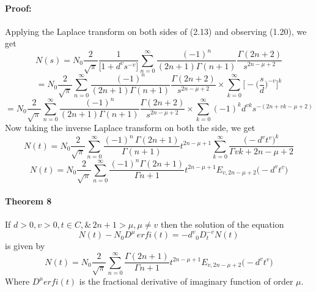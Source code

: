 \documentclass{article}
\begin{document}
\paragraph{Proof:}
Applying the Laplace transform on both sides of (2.13) and observing (1.20), we get
\begin{equation*}
    N(s)=N_0
    {\frac{2}{\sqrt{\pi}}}
    \frac{1}{\big[1+{d^v}{s^{-v}}\big]}
    \sum_{n = 0}^{\infty}
    \frac{(-1)^n}{(2n+1)\Gamma{(n+1)}}
    \frac{\Gamma{(2n+2)}}{s^{2n- \mu +2}}
\end{equation*}
\begin{equation*}
    =N_0
    {\frac{2}{\sqrt{\pi}}}
    \sum_{n = 0}^{\infty}
    \frac{(-1)^n}{(2n+1)\Gamma{(n+1)}}
    \frac{\Gamma{(2n+2)}}{s^{2n- \mu +2}}
    \times
    \sum_{k=0}^{\infty}
    \bigg[
        -{\bigg(\frac{s}{d}\bigg)^{-v}}
    \bigg]^k
\end{equation*}
\begin{equation*}
    =N_0
    {\frac{2}{\sqrt{\pi}}}
    \sum_{n = 0}^{\infty}
    \frac{(-1)^n}{(2n+1)\Gamma{(n+1)}}
    \frac{\Gamma{(2n+2)}}{s^{2n- \mu +2}}
    \times
    \sum_{k=0}^{\infty}
    (-1)^k{d^{vk}}{s^{-(2n+vk- \mu +2)}}
\end{equation*}
Now taking the inverse Laplace transform on both the side, we get
\begin{equation*}
    N(t)=N_0
    {\frac{2}{\sqrt{\pi}}}
    \sum_{n = 0}^{\infty}
    \frac{(-1)^n\,\Gamma{(2n+1)}}{\Gamma{(n+1)}}
    t^{2n-{\mu}+1}
    \sum_{k=0}^{\infty}
    \frac{\big(-{d^v}{t^v})^k}{\Gamma{vk+2n-\mu+2}}
\end{equation*}
\begin{equation*}
    N(t)=N_0
    {\frac{2}{\sqrt{\pi}}}
    \sum_{n = 0}^{\infty}
    \frac{(-1)^n\Gamma{(2n+1)}}{\Gamma{n+1}}
    t^{2n-{\mu}+1}
    E_{v, 2n-{\mu}+2}
    \big(-{d^v}{t^v})
\end{equation*}
\paragraph{Theorem 8}
If $d > 0, v > 0, t \in C, \& \,{2n+1} > \mu , \mu \neq {v} $ then the solution of the equation
\begin{equation}
    N(t) - {{N_0}D^{\mu}} \, erfi(t) = {-d^v}{_0D_t^{-v}}N(t)
\end{equation}  
is given by
\begin{equation}
    N(t)=N_0
    {\frac{2}{\sqrt{\pi}}}
    \sum_{n = 0}^{\infty}
    \frac{\Gamma{(2n+1)}}{\Gamma{n+1}}
    t^{2n-{\mu}+1}
    E_{v, 2n-{\mu}+2}
    \big(-{d^v}{t^v})
\end{equation}
Where $D^{\mu}erfi(t)$ is the fractional derivative of imaginary function of order $\mu$.
\end{document}

